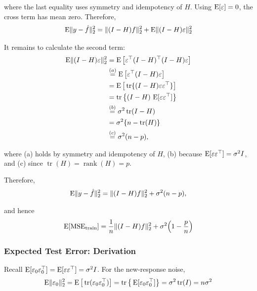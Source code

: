 where the last equality uses symmetry and idempotency of $H$. Using $\operatorname{E}[\varepsilon]=0$, the cross term has mean zero. Therefore,
\begin{equation*}
    \operatorname{E}\lVert y-\hat f \rVert_2^2 = \lVert (I-H)f \rVert_2^2 + \operatorname{E}\lVert (I-H)\varepsilon \rVert_2^2
\end{equation*}

It remains to calculate the second term:
\begin{align*}
    \operatorname{E}\lVert (I-H)\varepsilon \rVert_2^2 &= \operatorname{E}\big[\varepsilon^\top(I-H)^\top(I-H)\varepsilon\big] \\
    &\overset{(a)}{=} \operatorname{E}\big[\varepsilon^\top(I-H)\varepsilon\big] \\
    &= \operatorname{E}\big[\operatorname{tr}\{(I-H)\varepsilon\varepsilon^\top\}\big] \\
    &= \operatorname{tr}\big\{(I-H)\,\operatorname{E}[\varepsilon\varepsilon^\top]\big\} \\
    &\overset{(b)}{=} \sigma^2 \operatorname{tr}(I-H) \\
    &= \sigma^2\{n-\operatorname{tr}(H)\} \\
    &\overset{(c)}{=} \sigma^2(n-p),
\end{align*}

where (a) holds by symmetry and idempotency of $H$, (b) because $\operatorname{E}[\varepsilon\varepsilon^\top]=\sigma^2 I$, and (c) since $\operatorname{tr}(H)=\operatorname{rank}(H)=p$.

Therefore,
\begin{equation*}
    \operatorname{E}\lVert y-\hat f \rVert_2^2 = \lVert (I-H)f \rVert_2^2 + \sigma^2(n-p),
\end{equation*}

and hence
\begin{equation*}
    \operatorname{E}[\text{MSE}_{\text{train}}] = \frac{1}{n}\lVert (I-H)f \rVert_2^2 + \sigma^2\Big(1-\frac{p}{n}\Big)
\end{equation*}

\subsubsection{Expected Test Error: Derivation}
Recall $\operatorname{E}[\varepsilon_0\varepsilon_0^\top]=\operatorname{E}[\varepsilon\varepsilon^\top]=\sigma^2 I$. For the new-response noise,
\begin{equation*}
    \operatorname{E}\lVert \varepsilon_0 \rVert_2^2 = \operatorname{E}\big[\operatorname{tr}(\varepsilon_0\varepsilon_0^\top)\big] = \operatorname{tr}\big\{\operatorname{E}[\varepsilon_0\varepsilon_0^\top]\big\} = \sigma^2\operatorname{tr}(I) = n\sigma^2
\end{equation*}

